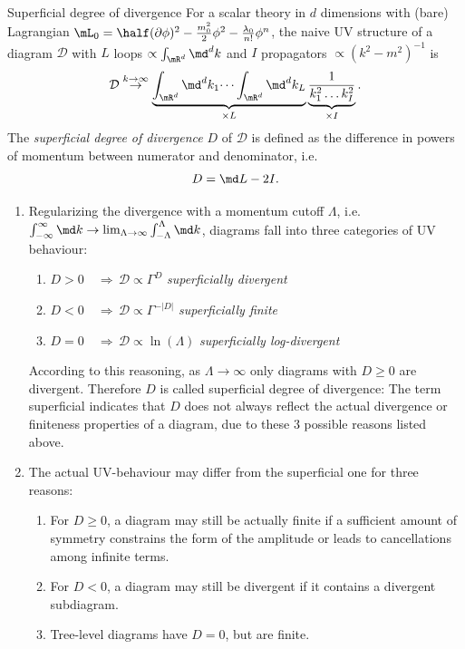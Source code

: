 \\
\\ 
\begin{mybox}{Superficial degree of divergence}
	For a scalar theory in $d$ dimensions with (bare) Lagrangian $\mL_0 = \half (\partial \phi)^2 - \frac{m^2_0}{2} \phi^2 - \frac{\lambda_0}{n!} \phi^n$, the naive UV structure of a diagram $\mathcal{D}$ with $L$ loops $\propto \int_{\mR^d} \md^d k$ and $I$ propagators $\propto (k^2-m^2)^{-1}$ is 
\begin{equation}
	\mathcal{D} \stackrel{k\rightarrow\infty}{\rightarrow} \underbrace{\int_{\mR^d} \md^d k_1 \dots \int_{\mR^d} \md^d k_L  }_{\times L} \underbrace{\frac{1}{k^2_1 \dots k^2_I} }_{\times I}.
\end{equation}
The  \emph{superficial degree of divergence} $D$ of $\mathcal{D}$ is defined as the difference in powers of momentum between numerator and denominator, i.e.
\begin{equation}
			D = \md L - 2 I.
\end{equation}
\end{mybox}
\begin{enumerate}
	\item Regularizing the divergence with a momentum cutoff $\Lambda$, i.e. $\int_{-\infty}^{\infty} \md k \rightarrow \lim_{\Lambda \rightarrow\infty} \int_{-\Lambda }^{\Lambda} \md k$, diagrams fall into three categories of UV behaviour:
	\begin{enumerate}
		\item $D>0 \quad \Rightarrow \, \mathcal{D}\propto \Gamma^D$ \emph{superficially  divergent}
		\item $D<0 \quad \Rightarrow \, \mathcal{D}\propto \Gamma^{-|D|}$ \emph{superficially finite}
		\item $D=0 \quad \Rightarrow \, \mathcal{D}\propto \ln(\Lambda)$ \emph{superficially log-divergent}
	\end{enumerate}

According to this reasoning, as $\Lambda \rightarrow\infty$ only diagrams with $D\geq0$ are divergent. Therefore $D$ is called superficial degree of divergence: The term superficial indicates that $D$ does not always reflect the actual divergence or finiteness properties of a diagram, due to these 3 possible reasons listed above.
\item The actual UV-behaviour may differ from the superficial one for three reasons:
\begin{enumerate}
	\item For $D\geq 0$, a diagram may still be actually finite if a sufficient amount of symmetry constrains the form of the amplitude or leads to cancellations among infinite terms.
	\item For $D<0$, a diagram may still be divergent if it contains a divergent subdiagram.
	\item Tree-level diagrams have $D=0$, but are finite.
\end{enumerate}
\end{enumerate}
